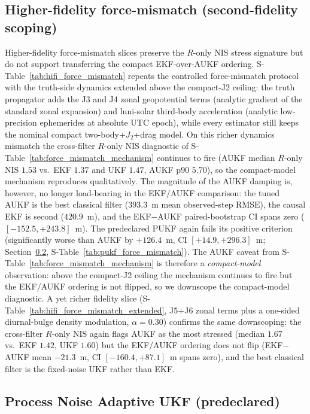 \documentclass{article}
\begin{document}
\subsection{Higher-fidelity force-mismatch (second-fidelity scoping)}\label{sec:hifi-force-mismatch}
Higher-fidelity force-mismatch slices preserve the \(R\)-only NIS stress signature but do not support transferring the compact EKF-over-AUKF ordering.
S-Table~\ref{tab:hifi_force_mismatch} repeats the controlled force-mismatch protocol with the truth-side dynamics extended above the compact-J2 ceiling: the truth propagator adds the J3 and J4 zonal geopotential terms (analytic gradient of the standard zonal expansion) and luni-solar third-body acceleration (analytic low-precision ephemerides at absolute UTC epoch), while every estimator still keeps the nominal compact two-body+$J_2$+drag model. On this richer dynamics mismatch the cross-filter $R$-only NIS diagnostic of S-Table~\ref{tab:force_mismatch_mechanism} continues to fire (AUKF median $R$-only NIS $1.53$ vs.\ EKF $1.37$ and UKF $1.47$, AUKF p90 $5.70$), so the compact-model mechanism reproduces qualitatively. The magnitude of the AUKF damping is, however, no longer load-bearing in the EKF$/$AUKF comparison: the tuned AUKF is the best classical filter ($393.3$~m mean observed-step RMSE), the causal EKF is second ($420.9$~m), and the EKF$-$AUKF paired-bootstrap CI spans zero ($[-152.5, +243.8]$~m). The predeclared PUKF again fails its positive criterion (significantly worse than AUKF by $+126.4$~m, CI $[+14.9, +296.3]$~m; Section~\ref{sec:pukf}, S-Table~\ref{tab:pukf_force_mismatch}). The AUKF caveat from S-Table~\ref{tab:force_mismatch_mechanism} is therefore a \emph{compact-model} observation: above the compact-J2 ceiling the mechanism continues to fire but the EKF$/$AUKF ordering is not flipped, so we downscope the compact-model diagnostic. A yet richer fidelity slice (S-Table~\ref{tab:hifi_force_mismatch_extended}, J5$+$J6 zonal terms plus a one-sided diurnal-bulge density modulation, $\alpha=0.30$) confirms the same downscoping: the cross-filter $R$-only NIS again flags AUKF as the most stressed (median $1.67$ vs.\ EKF $1.42$, UKF $1.60$) but the EKF$/$AUKF ordering does not flip (EKF$-$AUKF mean $-21.3$~m, CI $[-160.4, +87.1]$~m spans zero), and the best classical filter is the fixed-noise UKF rather than EKF.

\subsection{Process Noise Adaptive UKF (predeclared)}\label{sec:pukf}
\end{document}
